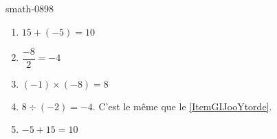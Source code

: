 
\begin{corrige}{smath-0898}

    \begin{multicols}{2}
        \begin{enumerate}
            \item
                \( 15+(-5)=10\)
            \item   \label{ItemGIJooYtorde}
                \( \dfrac{ -8 }{ 2 }=-4\)
            \item
                \( (-1)\times (-8)=8\)
            \item
                \( 8\div(-2)=-4\). C'est le même que le \ref{ItemGIJooYtorde}.
            \item
                \( -5+15=10\)
        \end{enumerate}
    \end{multicols}

\end{corrige}
